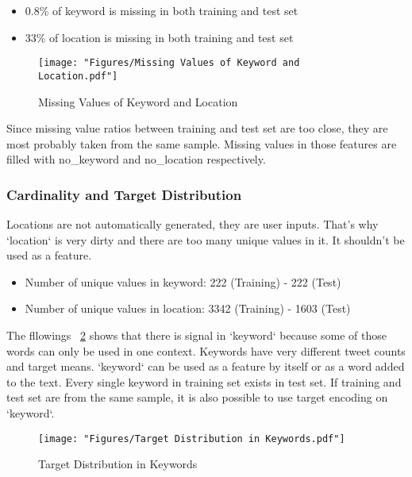 \begin{itemize}
	\item
    0.8\% of keyword is missing in both training and test set
	\item
	33\% of location is missing in both training and test set
\end{itemize}


\begin{figure}[tbph]
	\centering
	\texttt{[image: "Figures/Missing Values of Keyword and Location.pdf"]}
	\caption{Missing Values of Keyword and Location}
	\label{fig:missing-values-of-keyword-and-location}
\end{figure}

Since missing value ratios between training and test set 
are too close, they are most probably taken from the 
same sample. Missing values in those features are 
filled with no\_keyword and no\_location respectively.

\subsubsection{Cardinality and Target Distribution}

Locations are not automatically generated, they are user inputs. 
That's why `location` is very dirty and there are too many 
unique values in it. It shouldn't be used as a feature.

\begin{itemize}
	\item
	Number of unique values in keyword: 222 (Training) - 222 (Test)
	\item
	Number of unique values in location: 3342 (Training) - 1603 (Test)
\end{itemize}

The fllowings ~\cref{fig:Target-Distribution-in-Keywords} shows that 
there is signal in `keyword` because some of those words can only 
be used in one context. Keywords have very different tweet counts 
and target means. `keyword` can be used as a feature by itself or 
as a word added to the text. Every single keyword in training set 
exists in test set. If training and test set are from the same 
sample, it is also possible to use target encoding on `keyword`.

\begin{figure}[tbph]
	\centering
	\texttt{[image: "Figures/Target Distribution in Keywords.pdf"]}
	\caption{Target Distribution in Keywords}
	\label{fig:Target-Distribution-in-Keywords}
\end{figure}

